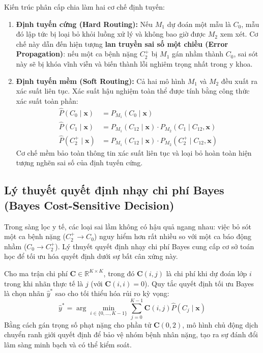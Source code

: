 Kiến trúc phân cấp chia làm hai cơ chế định tuyến:
\begin{enumerate}
    \item \textbf{Định tuyến cứng (Hard Routing):} Nếu $M_1$ dự đoán một mẫu là $C_0$, mẫu đó lập tức bị loại bỏ khỏi luồng xử lý và không bao giờ được $M_2$ xem xét. Cơ chế này dẫn đến hiện tượng \textbf{lan truyền sai số một chiều (Error Propagation)}: nếu một ca bệnh nặng $C_2^+$ bị $M_1$ gán nhầm thành $C_0$, sai sót này sẽ bị khóa vĩnh viễn và biến thành lỗi nghiêm trọng nhất trong y khoa.
    \item \textbf{Định tuyến mềm (Soft Routing):} Cả hai mô hình $M_1$ và $M_2$ đều xuất ra xác suất liên tục. Xác suất hậu nghiệm toàn thể được tính bằng công thức xác suất toàn phần:
    \begin{align}
        \hat{P}(C_0 \mid \mathbf{x}) &= P_{M_1}(C_0 \mid \mathbf{x}) \\
        \hat{P}(C_1 \mid \mathbf{x}) &= P_{M_1}(C_{12} \mid \mathbf{x}) \cdot P_{M_2}(C_1 \mid C_{12}, \mathbf{x}) \\
        \hat{P}(C_2^+ \mid \mathbf{x}) &= P_{M_1}(C_{12} \mid \mathbf{x}) \cdot P_{M_2}(C_2^+ \mid C_{12}, \mathbf{x})
    \end{align}
    Cơ chế mềm bảo toàn thông tin xác suất liên tục và loại bỏ hoàn toàn hiện tượng nghẽn sai số của định tuyến cứng.
\end{enumerate}

\subsection{Lý thuyết quyết định nhạy chi phí Bayes (Bayes Cost-Sensitive Decision)}
\label{subsec:cost-sensitive-paradigm}

Trong sàng lọc y tế, các loại sai lầm không có hậu quả ngang nhau: việc bỏ sót một ca bệnh nặng ($C_2^+ \to C_0$) nguy hiểm hơn rất nhiều so với một ca báo động nhầm ($C_0 \to C_2^+$). Lý thuyết quyết định nhạy chi phí Bayes \cite{elkan2001foundations} cung cấp cơ sở toán học để tối ưu hóa quyết định dưới sự bất cân xứng này.

Cho ma trận chi phí $\mathbf{C} \in \mathbb{R}^{K \times K}$, trong đó $\mathbf{C}(i, j)$ là chi phí khi dự đoán lớp $i$ trong khi nhãn thực tế là $j$ (với $\mathbf{C}(i, i) = 0$). Quy tắc quyết định tối ưu Bayes là chọn nhãn $\hat{y}^*$ sao cho tối thiểu hóa rủi ro kỳ vọng:
\begin{equation}
    \hat{y}^* = \arg\min_{i \in \{0, \dots, K-1\}} \sum_{j=0}^{K-1} \mathbf{C}(i, j) \hat{P}(C_j \mid \mathbf{x})
\end{equation}
Bằng cách gán trọng số phạt nặng cho phần tử $\mathbf{C}(0, 2)$, mô hình chủ động dịch chuyển ranh giới quyết định để bảo vệ nhóm bệnh nhân nặng, tạo ra sự đánh đổi lâm sàng minh bạch và có thể kiểm soát.

